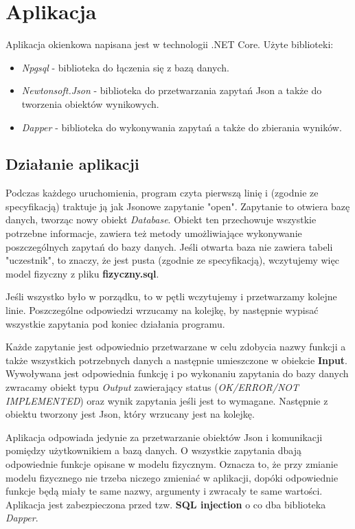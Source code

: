 \documentclass[a4paper]{article}
\begin{document}
\section{Aplikacja}
Aplikacja okienkowa napisana jest w technologii .NET Core. Użyte biblioteki:
\begin{itemize}
\item \textit{Npgsql} - biblioteka do łączenia się z bazą danych.
\item \textit{Newtonsoft.Json} - biblioteka do przetwarzania zapytań Json a także do tworzenia obiektów wynikowych.
\item \textit{Dapper} - biblioteka do wykonywania zapytań a także do zbierania wyników.
\end{itemize}

\subsection{Działanie aplikacji}
Podczas każdego uruchomienia, program czyta pierwszą linię i (zgodnie ze specyfikacją) traktuje ją jak Jsonowe zapytanie "open". Zapytanie to otwiera bazę danych, tworząc nowy obiekt \textit{Database}. Obiekt ten przechowuje wszystkie potrzebne informacje, zawiera też metody umożliwiające wykonywanie poszczególnych zapytań do bazy danych. Jeśli otwarta baza nie zawiera tabeli "uczestnik", to znaczy, że jest pusta (zgodnie ze specyfikacją), wczytujemy więc model fizyczny z pliku \textbf{fizyczny.sql}.

Jeśli wszystko było w porządku, to w pętli wczytujemy i przetwarzamy kolejne linie. Poszczególne odpowiedzi wrzucamy na kolejkę, by następnie wypisać wszystkie zapytania pod koniec działania programu.

Każde zapytanie jest odpowiednio przetwarzane w celu zdobycia nazwy funkcji a także wszystkich potrzebnych danych a następnie umieszczone w obiekcie \textbf{Input}. Wywoływana jest odpowiednia funkcję i po wykonaniu zapytania do bazy danych zwracamy obiekt typu \textit{Output} zawierający status (\textit{OK/ERROR/NOT IMPLEMENTED}) oraz wynik zapytania jeśli jest to wymagane. Następnie z obiektu tworzony jest Json, który wrzucany jest na kolejkę.

Aplikacja odpowiada jedynie za przetwarzanie obiektów Json i komunikacji pomiędzy użytkownikiem a bazą danych. O wszystkie zapytania dbają odpowiednie funkcje opisane w modelu fizycznym. Oznacza to, że przy zmianie modelu fizycznego nie trzeba niczego zmieniać w aplikacji, dopóki odpowiednie funkcje będą miały te same nazwy, argumenty i zwracały te same wartości. Aplikacja jest zabezpieczona przed tzw. \textbf{SQL injection} o co dba biblioteka \textit{Dapper}.
\end{document}
